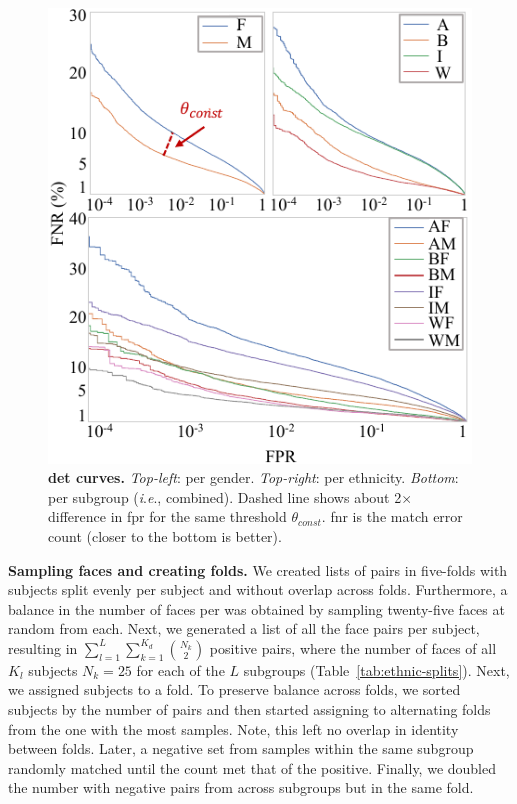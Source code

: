 \documentclass[10pt,twocolumn,letterpaper]{article}
\newcommand{\ie}{\textit{i}.\textit{e}., }
\begin{document}
\begin{figure}[!t] 
	\centering    
	\includegraphics[width=.9\linewidth]{figures/detcurve-improved.pdf}
		\caption{\small{\textbf{\gls{det} curves.} \emph{Top-left}: per gender. \emph{Top-right}: per ethnicity. \emph{Bottom}: per subgroup (\ie combined). Dashed line shows about 2$\times$ difference in \gls{fpr} for the same threshold $\theta_{const}$. \gls{fnr} is the match error count (closer to the bottom is better).}}
\label{fig:detcurves} 
\end{figure} 
\vspace{1mm}
\noindent\textbf{Sampling faces and creating folds.} We created lists of pairs in five-folds with subjects split evenly per subject and without overlap across folds. Furthermore, a balance in the number of faces per was obtained by sampling twenty-five faces at random from each. Next, we generated a list of all the face pairs per subject, resulting in $\sum_{l=1}^{L}\sum_{k=1}^{K_d} {N_k \choose 2}$ positive pairs, where the number of faces of all $K_l$ subjects $N_k=25$  for each of the $L$ subgroups (Table~\ref{tab:ethnic-splits}). Next, we assigned subjects to a fold. To preserve balance across folds, we sorted subjects by the number of pairs and then started assigning to alternating folds from the one with the most samples. Note, this left no overlap in identity between folds. Later, a negative set from samples within the same subgroup randomly matched until the count met that of the positive. Finally, we doubled the number with negative pairs from across subgroups but in the same fold.
\end{document}
